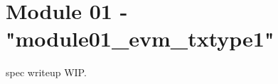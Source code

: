 \newpage
\section{Module 01 - {\ttfamily "module01\_evm\_txtype1"}}
\label{sec:module01_predicate}

spec writeup WIP.












